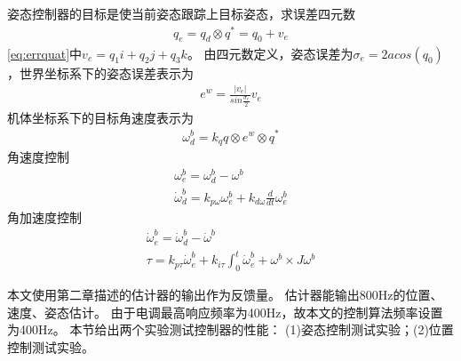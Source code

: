 \documentclass[
  type=master
]{gdutthesis}
\begin{document}
姿态控制器的目标是使当前姿态跟踪上目标姿态，求误差四元数\vspace{1ex}
\begin{gather}\label{eq:errquat}
	q_e = q_d \otimes q^{*} = q_0 + v_e
\end{gather}
\autoref{eq:errquat}中$v_e = q_1 i + q_2 j + q_3 k$。
由四元数定义，姿态误差为$\sigma_e = 2acos(q_0)$，世界坐标系下的姿态误差表示为
\begin{gather}
	e^w = \frac{\left| v_e \right|}{sin\frac{\sigma_e}{2}} v_e
\end{gather}
机体坐标系下的目标角速度表示为
\begin{gather}
	\omega^b_d = k_q q \otimes e^w \otimes q^{*}
\end{gather}
角速度控制
\begin{gather}\label{eq:angularacontrol}
	\omega^b_e = \omega^b_d - \omega^b\\
	\dot{\omega}^b_d = k_{p \omega} \omega^b_e + k_{d \omega} \frac{d}{dt}\omega^b_e
\end{gather}
角加速度控制
\begin{gather}\label{eq:angularaccelerationcontrol}
		\dot{\omega}^b_e = \dot{\omega}^b_d - \dot{\omega}^b\\
		\tau = k_{p \tau} \dot{\omega}^b_e + k_{i \tau} \int_{0}^{t}\dot{\omega}^b_e + \omega^b \times J \omega^b
\end{gather}

本文使用第二章描述的估计器的输出作为反馈量。
估计器能输出800Hz的位置、速度、姿态估计。
由于电调最高响应频率为400Hz，故本文的控制算法频率设置为400Hz。
本节给出两个实验测试控制器的性能：
(1)姿态控制测试实验；(2)位置控制测试实验。
\end{document}
